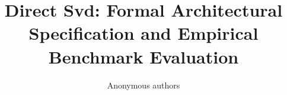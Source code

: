 \title{\textbf{Direct Svd: Formal Architectural Specification and Empirical Benchmark Evaluation}}

\author{Anonymous authors}

